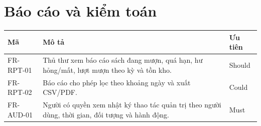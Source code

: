 \documentclass[12pt,a4paper,oneside]{report}
\begin{document}
\section{Báo cáo và kiểm toán}
\begin{longtable}{L{2.2cm}L{9.9cm}L{2.2cm}}
\toprule Mã & Mô tả & Ưu tiên\\\midrule\endhead
FR-RPT-01 & Thủ thư xem báo cáo sách đang mượn, quá hạn, hư hỏng/mất, lượt mượn theo kỳ và tồn kho. & Should\\
FR-RPT-02 & Báo cáo cho phép lọc theo khoảng ngày và xuất CSV/PDF. & Could\\
FR-AUD-01 & Người có quyền xem nhật ký thao tác quản trị theo người dùng, thời gian, đối tượng và hành động. & Must\\
\bottomrule
\end{longtable}
\end{document}
